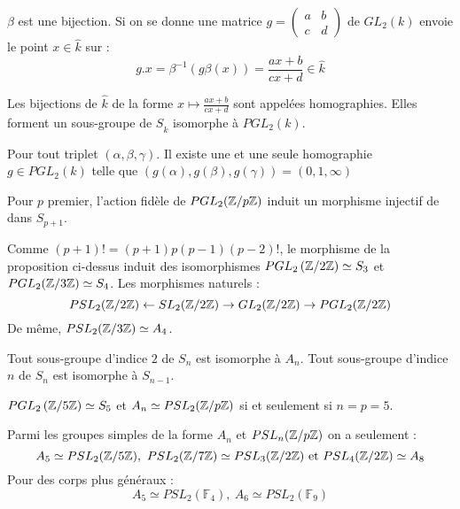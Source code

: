 \documentclass{cours}
\begin{document}
\begin{proposition}
    $\beta$ est une bijection. Si on se donne une matrice $g = \left(\begin{array}{cc} a & b \\ c & d
            \end{array}\right)$ de $GL_{2}(k)$ envoie le point $x \in \hat{k}$ sur :
    \[
        g.x = \beta^{-1}\left(g\beta(x)\right) = \frac{ax + b}{cx + d} \in \hat{k}
    \]
\end{proposition}

\begin{definition}
    Les bijections de $\hat{k}$ de la forme $x \mapsto \frac{ax +b}{cx +d}$ sont appelées homographies. Elles forment un sous-groupe de $S_{\hat{k}}$ isomorphe à $PGL_{2}(k)$.
\end{definition}
\begin{proposition}
    Pour tout triplet $\left(\alpha, \beta, \gamma\right)$. Il existe une et une seule homographie $g \in PGL_{2}(k)$ telle que $\left(g(\alpha), g(\beta), g(\gamma)\right) = \left(0, 1, \infty\right)$
\end{proposition}
\begin{proposition}
    Pour $p$ premier, l'action fidèle de $PGL_{2}(\mathbb{Z}/p\mathbb{Z})$ induit un morphisme injectif de dans $S_{p + 1}$.
\end{proposition}
\begin{corollary}
    Comme $\left(p + 1\right)! = (p + 1) p (p-1)(p - 2)!$, le morphisme de la proposition ci-dessus induit des isomorphismes $PGL_{2}\left(\mathbb{Z}/2\mathbb{Z}\right) \simeq S_{3}$ et $PGL_{2}(\mathbb{Z}/3\mathbb{Z}) \simeq S_{4}$. Les morphismes naturels :
    \[
        PSL_{2}(\mathbb{Z}/2\mathbb{Z}) \leftarrow SL_{2}(\mathbb{Z}/2\mathbb{Z}) \rightarrow GL_{2}(\mathbb{Z}/2\mathbb{Z}) \rightarrow PGL_{2}(\mathbb{Z}/2\mathbb{Z})
    \]
    De même, $PSL_{2}(\mathbb{Z}/3\mathbb{Z}) \simeq A_{4}$.
\end{corollary}

\begin{proposition}
    Tout sous-groupe d'indice $2$ de $S_{n}$ est isomorphe à $A_{n}$. Tout sous-groupe d'indice $n$ de $S_n$ est isomorphe à $S_{n - 1}$.
\end{proposition}

\begin{corollary}
    $PGL_{2}\left(\mathbb{Z}/5\mathbb{Z}\right) \simeq S_{5}$ et $A_{n} \simeq PSL_{2}(\mathbb{Z}/p\mathbb{Z})$ si et seulement si $n = p = 5$.
\end{corollary}

\begin{remark}
    Parmi les groupes simples de la forme $A_{n}$ et $PSL_{n}(\mathbb{Z}/p\mathbb{Z})$ on a seulement :
    \[
        A_{5} \simeq PSL_{2}(\znz{5}), \ PSL_{2}(\znz{7}) \simeq PSL_{3}(\znz{2}) \text{ et } PSL_{4}(\znz{2}) \simeq A_{8}
    \]
    Pour des corps plus généraux :
    \[
        A_{5} \simeq PSL_{2}(\mathbb{F}_{4}), \ A_{6} \simeq PSL_{2}(\mathbb{F}_{9})
    \]
\end{remark}
\end{document}
